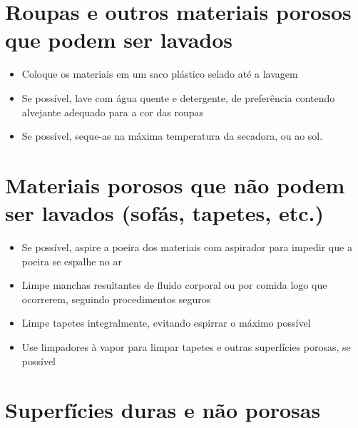 \documentclass[onecolumn,journal]{IEEEtran}
\begin{document}
\begin{multicols}{2}
\section*{Roupas e outros materiais porosos que podem ser lavados}

\begin{itemize}
    \item Coloque os materiais em um saco plástico selado até a lavagem
    \item Se possível, lave com água quente e detergente, de preferência contendo alvejante adequado para a cor das roupas
    \item Se possível, seque-as na máxima temperatura da secadora, ou ao sol.
\end{itemize}

\section*{Materiais porosos que não podem ser lavados (sofás, tapetes, etc.)}

\begin{itemize}
    \item Se possível, aspire a poeira dos materiais com aspirador para impedir que a poeira se espalhe no ar
    \item Limpe manchas resultantes de fluido corporal ou por comida logo que ocorrerem, seguindo procedimentos seguros
    \item Limpe tapetes integralmente, evitando espirrar o máximo possível
    \item Use limpadores à vapor para limpar tapetes e outras superfícies porosas, se possível
\end{itemize}

\section*{Superfícies duras e não porosas}


\end{multicols}
\end{document}
